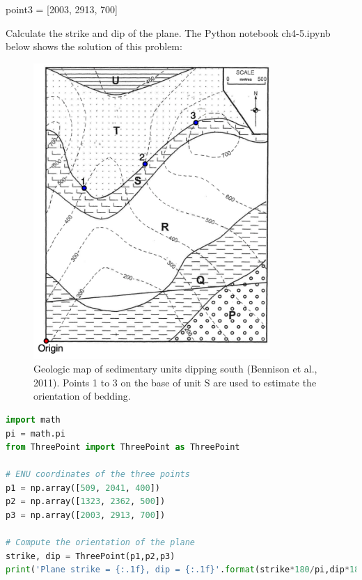 \documentclass[a4paper , 12pt]{book}
\begin{document}
point3 = [2003, 2913, 700] 

Calculate the strike and dip of the plane. The Python notebook ch4-5.ipynb below shows the solution of this problem:\\ 

\begin{figure}[ht]
    \centering
    \includegraphics[width=9cm]{Figures/ch4f7.png}
    \caption{Geologic map of sedimentary units dipping south (Bennison et al., 2011). Points 1 to 3 on the base of unit S are used to estimate the orientation of bedding.}
\end{figure}

\begin{center}
\begin{lstlisting}[language=Python, frame=single]
import math
pi = math.pi
from ThreePoint import ThreePoint as ThreePoint

# ENU coordinates of the three points
p1 = np.array([509, 2041, 400])
p2 = np.array([1323, 2362, 500])
p3 = np.array([2003, 2913, 700])

# Compute the orientation of the plane
strike, dip = ThreePoint(p1,p2,p3)
print('Plane strike = {:.1f}, dip = {:.1f}'.format(strike*180/pi,dip*180/pi))
\end{lstlisting}
\end{center}

\end{document}
